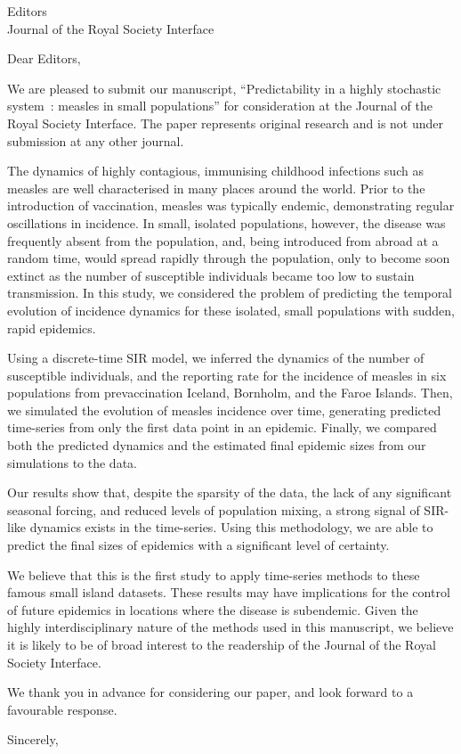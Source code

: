 \documentclass[fromalign=right,backaddress=false]{scrlttr2}
\begin{document}
 
\begin{letter}{\small Editors \\ \small Journal of the Royal Society Interface} 
  \opening{Dear Editors,} 
  We are pleased to submit our manuscript, ``Predictability in a highly stochastic system~: measles in small populations'' for consideration at the Journal of the Royal Society Interface. The paper represents original research and is not under submission at any other journal.
  \vspace{0.3cm}
  
  The dynamics of highly contagious, immunising childhood infections such as measles are well characterised in many places around the world. Prior to the introduction of vaccination, measles was typically endemic, demonstrating regular oscillations in incidence. In small, isolated populations, however, the disease was frequently absent from the population, and, being introduced from abroad at a random time, would spread rapidly through the population, only to become soon extinct as the number of susceptible individuals became too low to sustain transmission. In this study, we considered the problem of predicting the temporal evolution of incidence dynamics for these isolated, small populations with sudden, rapid epidemics. 
    \vspace{0.3cm}
  
  Using a discrete-time SIR model, we inferred the dynamics of the number of susceptible individuals, and the reporting rate for the incidence of measles in six populations from prevaccination Iceland, Bornholm, and the Faroe Islands. Then, we simulated the evolution of measles incidence over time, generating predicted time-series from only the first data point in an epidemic. Finally, we compared both the predicted dynamics and the estimated final epidemic sizes from our simulations to the data. 
      \vspace{0.3cm}
      
  Our results show that, despite the sparsity of the data, the lack of any significant seasonal forcing, and reduced levels of population mixing, a strong signal of SIR-like dynamics exists in the time-series. Using this methodology, we are able to predict the final sizes of epidemics with a significant level of certainty. 
    \vspace{0.3cm}

We believe that this is the first study to apply time-series methods to these famous small island datasets. These results may have implications for the control of future epidemics in locations where the disease is subendemic. Given the highly interdisciplinary nature of the methods used in this manuscript, we believe it is likely to be of broad interest to the readership of the Journal of the Royal Society Interface.
    \vspace{0.3cm}

We thank you in advance for considering our paper, and look forward to a favourable response.


  
  
  
  \closing{Sincerely,}
\end{letter} 
\end{document}
